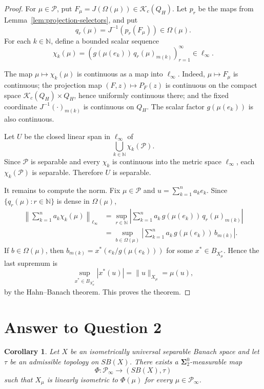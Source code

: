 \documentclass[11pt]{article}
\newtheorem{corollary}[theorem]{Corollary}
\newcommand{\PP}{\mathcal P}
\newcommand{\Nat}{\mathbb N}
\newcommand{\K}{\mathcal K}
\begin{document}
\begin{proof}
For \(\mu\in\PP\), put \(F_\mu=J(\Omega(\mu))\in\K_c(Q_H)\). Let \(p_r\) be
the maps from Lemma~\ref{lem:projection-selectors}, and put
\[
q_r(\mu)=J^{-1}(p_r(F_\mu))\in \Omega(\mu).
\]
For each \(k\in\Nat\), define a bounded scalar sequence
\[
\chi_k(\mu)
 =
\left(g(\mu(e_k))\, q_r(\mu)_{m(k)}\right)_{r=1}^\infty
\in \ell_\infty.
\]

The map \(\mu\mapsto\chi_k(\mu)\) is continuous as a map into \(\ell_\infty\).
Indeed, \(\mu\mapsto F_\mu\) is continuous; the projection map
\((F,z)\mapsto P_F(z)\) is continuous on the compact space
\(\K_c(Q_H)\times Q_H\), hence uniformly continuous there; and the fixed
coordinate \(J^{-1}(\cdot)_{m(k)}\) is continuous on \(Q_H\). The scalar factor
\(g(\mu(e_k))\) is also continuous.

Let \(U\) be the closed linear span in \(\ell_\infty\) of
\[
\bigcup_{k\in\Nat}\chi_k(\PP).
\]
Since \(\PP\) is separable and every \(\chi_k\) is continuous into the metric
space \(\ell_\infty\), each \(\chi_k(\PP)\) is separable. Therefore \(U\) is
separable.

It remains to compute the norm. Fix \(\mu\in\PP\) and
\(u=\sum_{k=1}^n a_ke_k\). Since \(\{q_r(\mu):r\in\Nat\}\) is dense in
\(\Omega(\mu)\),
\begin{align*}
\left\|\sum_{k=1}^n a_k\chi_k(\mu)\right\|_{\ell_\infty}
&=
\sup_{r\in\Nat}
\left|
\sum_{k=1}^n a_k\,g(\mu(e_k))\,q_r(\mu)_{m(k)}
\right|\\
&=
\sup_{b\in\Omega(\mu)}
\left|
\sum_{k=1}^n a_k\,g(\mu(e_k))\,b_{m(k)}
\right|.
\end{align*}
If \(b\in\Omega(\mu)\), then \(b_{m(k)}=x^*(e_k/g(\mu(e_k)))\) for some
\(x^*\in B_{X_\mu^*}\). Hence the last supremum is
\[
\sup_{x^*\in B_{X_\mu^*}} |x^*(u)|=\|u\|_{X_\mu}=\mu(u),
\]
by the Hahn--Banach theorem. This proves the theorem.
\end{proof}

\section*{Answer to Question 2}

\begin{corollary}
\label{cor:q2}
Let \(X\) be an isometrically universal separable Banach space and let
\(\tau\) be an admissible topology on \(SB(X)\). There exists a
\(\boldsymbol{\Sigma}^0_2\)-measurable map
\[
\Phi:\PP_\infty\to (SB(X),\tau)
\]
such that \(X_\mu\) is linearly isometric to \(\Phi(\mu)\) for every
\(\mu\in\PP_\infty\).
\end{corollary}
\end{document}

